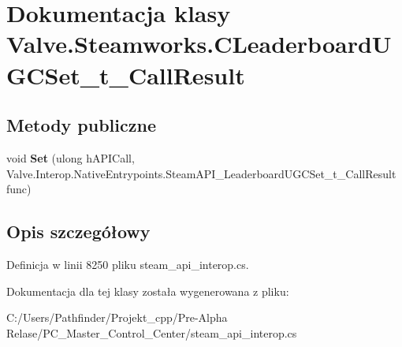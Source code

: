 \hypertarget{class_valve_1_1_steamworks_1_1_c_leaderboard_u_g_c_set__t___call_result}{}\section{Dokumentacja klasy Valve.\+Steamworks.\+C\+Leaderboard\+U\+G\+C\+Set\+\_\+t\+\_\+\+Call\+Result}
\label{class_valve_1_1_steamworks_1_1_c_leaderboard_u_g_c_set__t___call_result}
\subsection*{Metody publiczne}
\begin{DoxyCompactItemize}
\item 
\mbox{\label{class_valve_1_1_steamworks_1_1_c_leaderboard_u_g_c_set__t___call_result_a26d7d7e30fc608294715376149bed817}} 
void {\bfseries Set} (ulong h\+A\+P\+I\+Call, Valve.\+Interop.\+Native\+Entrypoints.\+Steam\+A\+P\+I\+\_\+\+Leaderboard\+U\+G\+C\+Set\+\_\+t\+\_\+\+Call\+Result func)
\end{DoxyCompactItemize}


\subsection{Opis szczegółowy}


Definicja w linii 8250 pliku steam\+\_\+api\+\_\+interop.\+cs.



Dokumentacja dla tej klasy została wygenerowana z pliku\+:\begin{DoxyCompactItemize}
\item 
C\+:/\+Users/\+Pathfinder/\+Projekt\+\_\+cpp/\+Pre-\/\+Alpha Relase/\+P\+C\+\_\+\+Master\+\_\+\+Control\+\_\+\+Center/steam\+\_\+api\+\_\+interop.\+cs\end{DoxyCompactItemize}
